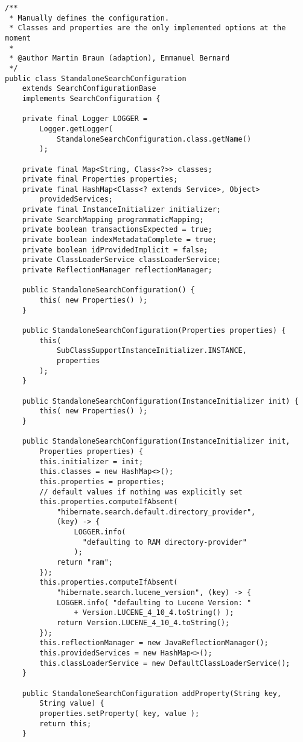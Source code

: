 \begin{lstlisting}[frame=htrbl, caption={StandaloneSearchConfiguration.java}, label={lst:StandaloneSearchConfiguration.java}]
/**
 * Manually defines the configuration. 
 * Classes and properties are the only implemented options at the moment
 *
 * @author Martin Braun (adaption), Emmanuel Bernard
 */
public class StandaloneSearchConfiguration 
	extends SearchConfigurationBase 
	implements SearchConfiguration {

	private final Logger LOGGER = 
		Logger.getLogger( 
			StandaloneSearchConfiguration.class.getName() 
		);
		
	private final Map<String, Class<?>> classes;
	private final Properties properties;
	private final HashMap<Class<? extends Service>, Object> 
		providedServices;
	private final InstanceInitializer initializer;
	private SearchMapping programmaticMapping;
	private boolean transactionsExpected = true;
	private boolean indexMetadataComplete = true;
	private boolean idProvidedImplicit = false;
	private ClassLoaderService classLoaderService;
	private ReflectionManager reflectionManager;

	public StandaloneSearchConfiguration() {
		this( new Properties() );
	}

	public StandaloneSearchConfiguration(Properties properties) {
		this( 
			SubClassSupportInstanceInitializer.INSTANCE, 
			properties
		);
	}

	public StandaloneSearchConfiguration(InstanceInitializer init) {
		this( new Properties() );
	}

	public StandaloneSearchConfiguration(InstanceInitializer init, 
		Properties properties) {
		this.initializer = init;
		this.classes = new HashMap<>();
		this.properties = properties;
		// default values if nothing was explicitly set
		this.properties.computeIfAbsent(
			"hibernate.search.default.directory_provider", 
			(key) -> {
				LOGGER.info( 
				  "defaulting to RAM directory-provider" 
				);
			return "ram";
		});
		this.properties.computeIfAbsent(
			"hibernate.search.lucene_version", (key) -> {
			LOGGER.info( "defaulting to Lucene Version: " 
				+ Version.LUCENE_4_10_4.toString() );
			return Version.LUCENE_4_10_4.toString();
		});
		this.reflectionManager = new JavaReflectionManager();
		this.providedServices = new HashMap<>();
		this.classLoaderService = new DefaultClassLoaderService();
	}

	public StandaloneSearchConfiguration addProperty(String key,
		String value) {
		properties.setProperty( key, value );
		return this;
	}


\end{lstlisting}
